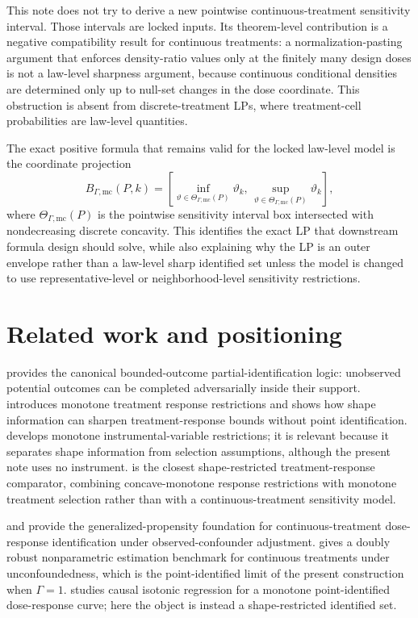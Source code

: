 \documentclass[11pt]{article}
\theoremstyle{definition}
\theoremstyle{plain}
\theoremstyle{remark}
\begin{document}
This note does not try to derive a new pointwise continuous-treatment sensitivity interval.  Those intervals are locked inputs.  Its theorem-level contribution is a negative compatibility result for continuous treatments: a normalization-pasting argument that enforces density-ratio values only at the finitely many design doses is not a law-level sharpness argument, because continuous conditional densities are determined only up to null-set changes in the dose coordinate.  This obstruction is absent from discrete-treatment LPs, where treatment-cell probabilities are law-level quantities.

The exact positive formula that remains valid for the locked law-level model is the coordinate projection
\[
  B_{\Gamma,\mathrm{mc}}(P,k)
  =
  \left[
  \inf_{\vartheta\in\Theta_{\Gamma,\mathrm{mc}}(P)}\vartheta_k,\,
  \sup_{\vartheta\in\Theta_{\Gamma,\mathrm{mc}}(P)}\vartheta_k
  \right],
\]
where \(\Theta_{\Gamma,\mathrm{mc}}(P)\) is the pointwise sensitivity interval box intersected with nondecreasing discrete concavity.  This identifies the exact LP that downstream formula design should solve, while also explaining why the LP is an outer envelope rather than a law-level sharp identified set unless the model is changed to use representative-level or neighborhood-level sensitivity restrictions.

\section{Related work and positioning}
\cite{Manski1990} provides the canonical bounded-outcome partial-identification logic: unobserved potential outcomes can be completed adversarially inside their support.  \cite{Manski1997} introduces monotone treatment response restrictions and shows how shape information can sharpen treatment-response bounds without point identification.  \cite{ManskiPepper2000} develops monotone instrumental-variable restrictions; it is relevant because it separates shape information from selection assumptions, although the present note uses no instrument.  \cite{OkumuraUsui2014} is the closest shape-restricted treatment-response comparator, combining concave-monotone response restrictions with monotone treatment selection rather than with a continuous-treatment sensitivity model.

\cite{Imbens2000} and \cite{HiranoImbens2004} provide the generalized-propensity foundation for continuous-treatment dose-response identification under observed-confounder adjustment.  \cite{KennedyMaMcHughSmall2017} gives a doubly robust nonparametric estimation benchmark for continuous treatments under unconfoundedness, which is the point-identified limit of the present construction when \(\Gamma=1\).  \cite{WestlingGilbertCarone2020} studies causal isotonic regression for a monotone point-identified dose-response curve; here the object is instead a shape-restricted identified set.
\end{document}
